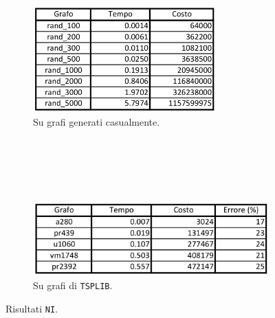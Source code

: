 \begin{figure}[H]
    \centering
    \begin{subfigure}{\linewidth}
        \centering
        \includegraphics[width=200pt]{img/NIrandom.png}
        \caption*{Su grafi generati casualmente.}
    \end{subfigure}
    \ \\
    \ \\
    \ \\
    \ \\
    \begin{subfigure}{\linewidth}
        \centering
        \includegraphics[width=300pt]{img/NItsplib.png}
        \caption*{Su grafi di \texttt{TSPLIB}.}
    \end{subfigure}
    \caption{Risultati \texttt{NI}.}
\end{figure}
\ \\
\ \\

